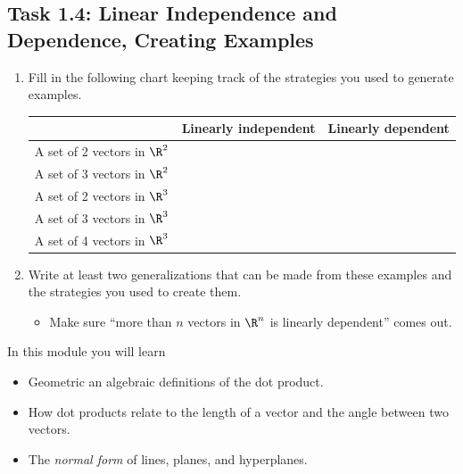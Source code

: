 \documentclass{problemset}
\begin{document}
\begin{iola}
\section*{Task 1.4: Linear Independence and Dependence, Creating Examples}



\begin{enumerate}
	\item Fill in the following chart keeping track of the strategies you used to generate
examples.

\vspace{2mm}

\begin{center}
\begin{tabular}{|c|c|c|}
	\hline
	&Linearly independent & Linearly dependent \\
	\hline
	A set of 2 vectors in $\R^2$ &&\\
	\hline
	A set of 3 vectors in $\R^2$ &&\\
	\hline
	A set of 2 vectors in $\R^3$ &&\\
	\hline
	A set of 3 vectors in $\R^3$ &&\\
	\hline
	A set of 4 vectors in $\R^3$ &&\\
	\hline
\end{tabular}
\end{center}

		\item Write at least two generalizations that can
			be made from these examples and the strategies you
			used to create them.
	\begin{annotation}
		\begin{notes}
			\begin{itemize}
				\item Make sure ``more than $n$ vectors in $\R^n$
					is linearly dependent'' comes out.
			\end{itemize}
		\end{notes}
	\end{annotation}

\end{enumerate}

\end{iola}


\begin{module}

	In this module you will learn
	\begin{itemize}
		\item Geometric an algebraic definitions of the dot product.
		\item How dot products relate to the length of a vector and the angle
			between two vectors.
		\item The \emph{normal form} of lines, planes, and hyperplanes.
	\end{itemize}

	
\end{module}
\end{document}
